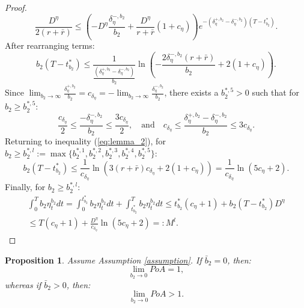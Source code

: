 \documentclass[11pt]{article}
\newtheorem{proposition}{Proposition}
\begin{document}
\begin{proof}
	$$\frac{D^\eta}{2(r+\bar{r})}\leq \left(-D^\eta\frac{\delta^{-,b_2}_\eta }{b_2}+\frac{D^\eta}{r+\bar{r}}(1+c_\eta) \right) e^{-\left(\delta^{+,b_2}_\eta -\delta^{-,b_2}_\eta\right)(T-t^*_{b_2})}.$$
	After rearranging terms:
	\begin{equation}
	b_2(T-t^*_{b_2})\leq \frac{1}{\frac{\left(\delta^{+,b_2}_\eta -\delta^{-,b_2}_\eta\right)}{b_2}} \ln \left( -\frac{2\delta^{-,b_2}_\eta(r+\bar{r})}{b_2}+2(1+c_\eta) \right).
	\label{eq:lemma_2}
	\end{equation}
	Since $\lim_{b_2 \to \infty}\frac{\delta^{+,b_2}_\eta}{b_2}=c_{\delta_\eta}=-\lim_{b_2 \to \infty}\frac{\delta^{-,b_2}_\eta}{b_2}$, there exists a $b_2^{*,5}>0$ such that for $b_2 \geq b_2^{*,5}$:
	$$\frac{c_{\delta_\eta}}{2} \leq \frac{-\delta^{-,b_2}_\eta}{b_2} \leq \frac{3c_{\delta_\eta}}{2}, \quad \text{and} \quad c_{\delta_\eta} \leq \frac{\delta^{+,b_2}_\eta-\delta^{-,b_2}_\eta}{b_2} \leq 3c_{\delta_\eta}.$$	
	Returning to inequality (\ref{eq:lemma_2}), for $b_2 \geq b_2^{*,l}:=\max \{b_2^{*,1},b_2^{*,2},b_2^{*,3},b_2^{*,4},b_2^{*,5}\}$:
	$$ b_2(T-t^*_{b_2})\leq \frac{1}{c_{\delta_\eta}} \ln \left(3 (r+\bar{r})c_{\delta_\eta}+2(1+c_\eta) \right)=\frac{1}{c_{\delta_\eta}} \ln \left(5c_\eta+2 \right).$$
	Finally, for $b_2 \geq b_2^{*,l}$:
	\begin{equation*}
	\begin{split}
	\int_0^T b_2 \eta^{b_2}_t dt=\int_0^{t^*_{b_2}} b_2 \eta^{b_2}_t dt+\int_{t^*_{b_2}}^T b_2 \eta^{b_2}_t dt \leq t^*_{b_2}(c_\eta+1)+b_2 (T-t^*_{b_2})D^\eta \\
	\leq T(c_\eta+1)+\frac{D^\eta}{c_{\delta_\eta}} \ln \left( 5c_\eta+2 \right)=:M^l.
	\end{split}
	\end{equation*}
\end{proof}


\begin{proposition}
	Assume Assumption \ref{assumption}. If $\bar{b}_2= 0$, then:
	\begin{equation*}
	\lim_{b_2 \to 0} PoA = 1,
	\end{equation*}
	whereas if $\bar{b}_2 > 0$, then:
	\begin{equation*}
	\lim_{b_2 \to 0} PoA > 1.
	\end{equation*}
\label{prop:b2_to_0}
\end{proposition}
\end{document}
